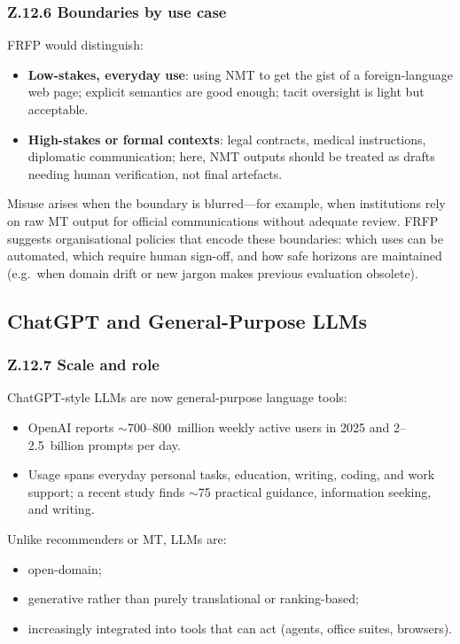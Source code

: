\subsubsection*{Z.12.6 Boundaries by use case}

FRFP would distinguish:

\begin{itemize}
\item \textbf{Low-stakes, everyday use}:
using NMT to get the gist of a foreign-language web page; explicit
semantics are good enough; tacit oversight is light but acceptable.
\item \textbf{High-stakes or formal contexts}:
legal contracts, medical instructions, diplomatic communication;
here, NMT outputs should be treated as drafts needing human
verification, not final artefacts.
\end{itemize}

Misuse arises when the boundary is blurred---for example, when institutions
rely on raw MT output for official communications without adequate review.
FRFP suggests organisational policies that encode these boundaries: which
uses can be automated, which require human sign-off, and how safe horizons
are maintained (e.g.\ when domain drift or new jargon makes previous
evaluation obsolete).

\subsection{ChatGPT and General-Purpose LLMs}

\subsubsection*{Z.12.7 Scale and role}

ChatGPT-style LLMs are now general-purpose language tools:

\begin{itemize}
\item OpenAI reports $\sim$700--800~million weekly active users in 2025
and 2–2.5~billion prompts per day.
\item Usage spans everyday personal tasks, education, writing, coding, and
work support; a recent study finds $\sim$75%
practical guidance, information seeking, and writing.
\end{itemize}

Unlike recommenders or MT, LLMs are:

\begin{itemize}
\item open-domain;
\item generative rather than purely translational or ranking-based;
\item increasingly integrated into tools that can act (agents, office
suites, browsers).
\end{itemize}

